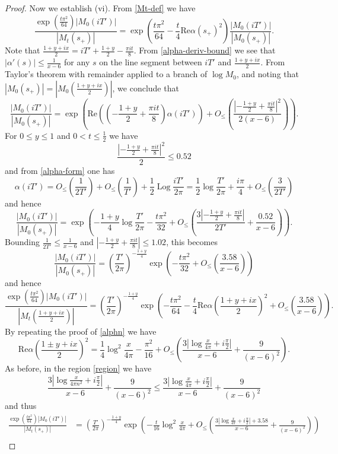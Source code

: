 \documentclass[a4paper,11pt,twoside]{amsart}
\newcommand\Log{{\operatorname{Log}}}
\begin{document}
\begin{proof}
Now we establish (vi).  From \eqref{Mt-def} we have
$$\frac{\exp\left( \frac{t \pi^2}{64}\right) |M_0(iT')|}{|M_t(s_+)|}
= \exp\left( \frac{t \pi^2}{64} - \frac{t}{4} \mathrm{Re} \alpha(s_+)^2\right) \frac{|M_0(iT')|}{|M_0(s_+)|}.$$
Note that $\frac{1+y+ix}{2} = iT' + \frac{1+y}{2} - \frac{\pi i t}{8}$.  From \eqref{alpha-deriv-bound} we see that $|\alpha'(s)| \leq \frac{1}{x-6}$ for any $s$ on the line segment between $iT'$ and $\frac{1+y+ix}{2}$.  From Taylor's theorem with remainder applied to a branch of $\log M_0$, and noting that $|M_0(s_+)| = |M_0(\frac{1+y+ix}{2})|$, we conclude that
$$ \frac{|M_0(iT')|}{|M_0(s_+)|} = \exp\left( \mathrm{Re}\left( \left(-\frac{1+y}{2}+\frac{\pi i t}{8}\right) \alpha(iT') \right) + O_{\leq}\left( \frac{|-\frac{1+y}{2}+\frac{\pi i t}{8}|^2}{2(x-6)} \right) \right).$$
For $0 \leq y \leq 1$ and $0 < t \leq \frac{1}{2}$ we have
$$\frac{|-\frac{1+y}{2}+\frac{\pi i t}{8}|^2}{2} \leq 0.52$$
and from \eqref{alpha-form} one has
$$ \alpha(iT') = O_{\leq}\left(\frac{1}{2T'}\right) +  O_{\leq}\left(\frac{1}{T'}\right) + \frac{1}{2} \Log \frac{iT'}{2\pi} = \frac{1}{2} \log \frac{T'}{2\pi} + \frac{i\pi}{4} + O_{\leq}( \frac{3}{2T'} ) $$
and hence
$$
\frac{|M_0(iT')|}{|M_0(s_+)|}
= \exp\left( -\frac{1+y}{4} \log \frac{T'}{2\pi} - \frac{t\pi^2}{32} + O_{\leq}\left( \frac{3|-\frac{1+y}{2}+\frac{\pi i t}{8}|}{2T'} + \frac{0.52}{x-6} \right) \right).$$
Bounding $\frac{1}{2T'} \leq \frac{1}{x-6}$ and $|-\frac{1+y}{2}+\frac{\pi i t}{8}| \leq 1.02$, this becomes
$$
\frac{|M_0(iT')|}{|M_0(s_+)|}
= \left(\frac{T'}{2\pi}\right)^{-\frac{1+y}{4}} \exp\left( - \frac{t\pi^2}{32} + O_{\leq}\left( \frac{3.58}{x-6} \right) \right)$$
and hence
$$\frac{\exp\left( \frac{t \pi^2}{64}\right) |M_0(iT')|}{|M_t(\frac{1+y+ix}{2})|} 
= \left(\frac{T'}{2\pi}\right)^{-\frac{1+y}{4}} \exp\left( - \frac{t \pi^2}{64} - \frac{t}{4} \mathrm{Re} \alpha\left(\frac{1+y+ix}{2}\right)^2 + O_{\leq}\left( \frac{3.58}{x-6} \right) \right).$$
By repeating the proof of \eqref{alphn} we have
$$
\mathrm{Re} \alpha(\frac{1 \pm y + ix}{2})^2 = \frac{1}{4} \log^2 \frac{x}{4\pi} - \frac{\pi^2}{16} + 
O_{\leq}\left( \frac{3 |\log \frac{x}{4\pi} + i \frac{\pi}{2}|}{x-6} + \frac{9}{(x-6)^2}\right).
$$
As before, in the region \eqref{region} we have
$$\frac{3 |\log \frac{x}{4\pi n^2} + i \frac{\pi}{2}|}{x-6} + \frac{9}{(x-6)^2} \leq \frac{3 |\log \frac{x}{4\pi} + i \frac{\pi}{2}|}{x-6} + \frac{9}{(x-6)^2}
$$
and thus
\begin{align*}
\frac{\exp\left( \frac{t \pi^2}{64}\right) |M_0(iT')|}{|M_t(s_+)|}
&= \left(\frac{T'}{2\pi}\right)^{-\frac{1+y}{4}} \exp\left( - \frac{t}{16} \log^2 \frac{x}{4\pi} + O_{\leq}\left( \frac{3 |\log \frac{x}{4\pi} + i \frac{\pi}{2}|+3.58}{x-6} + \frac{9}{(x-6)^2} \right) \right)\\

\end{align*}
\end{proof}
\end{document}
